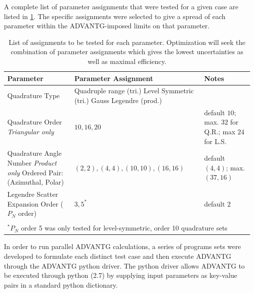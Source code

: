 \documentclass[10pt]{article}
\begin{document}
A complete list of parameter assignments that were tested for a given case are listed in \cref{tab:parameter-tests}.
The specific assignments were selected to give a spread of each parameter within the ADVANTG-imposed limits on that parameter.

\begin{table}[!ht]
\caption{%
List of assignments to be tested for each parameter.
Optimization will seek the combination of parameter assignments which gives the lowest uncertainties as well as maximal efficiency.}
\label{tab:parameter-tests}
\singlespacing
\begin{tabularx}{\textwidth}{XXX}
    \toprule
    Parameter
    & Parameter Assignment
    & Notes
    \\\midrule
      Quadrature Type
    & Quadruple range (tri.)                    \newline
      Level Symmetric (tri.)                    \newline
      Gauss Legendre (prod.)
    & \\
      Quadrature Order                          \newline
      \textit{Triangular only}
    & $10,16,20$
    & default $10$; max. $32$ for Q.R.;         \newline
      max $24$ for L.S.
    \\
      Quadrature Angle Number                   \newline
      \textit{Product only}                     \newline
      {\small Ordered Pair: (Azimuthal, Polar)}
    & $(2,2),(4,4),(10,10),(16,16)$
    & default $(4,4)$; max. $(37,16)$
    \\
      Legendre Scatter Expansion                \newline
      Order ($P_{N}$ order)
    & $3,5^{*}$
    & default $2$
    \\
\bottomrule
\\
\multicolumn{3}{l}{$^{*} P_N$ order 5 was only tested for level-symmetric, order 10 quadrature sets} %
\end{tabularx}
\end{table}
\onehalfspacing

In order to run parallel ADVANTG calculations, a series of programs sets were developed to formulate each distinct test case and then execute ADVANTG through the ADVANTG python driver. The python driver allows ADVANTG to be executed through python (2.7) by supplying input parameters as key-value pairs in a standard python dictionary.
\end{document}
